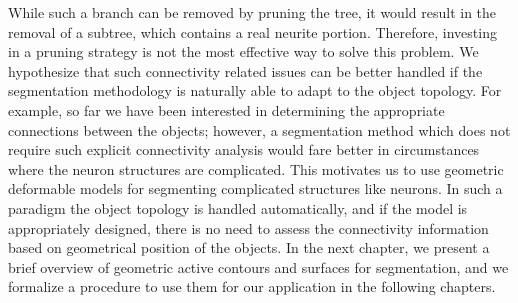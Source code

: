 While such a branch can be removed by pruning the tree, it would result in the removal of a subtree, which  contains a real neurite portion. Therefore, investing in  a pruning strategy is not the most effective way to solve this problem. We hypothesize that such connectivity related issues can be better handled if the segmentation methodology is naturally able to adapt to the object topology. For example, so far we have been interested in determining the appropriate connections between the objects; however, a segmentation method which does not require such explicit connectivity analysis would fare better in circumstances where the neuron structures are complicated. This motivates us to use geometric deformable models \cite{osher_sethian,caselles_geodesic} for segmenting complicated structures like neurons. In such a paradigm the object topology is handled automatically, and if the model is appropriately designed, there is no need to assess the connectivity information based on geometrical position of the objects. In the next chapter, we present a  brief overview of geometric active contours and surfaces for segmentation, and we formalize a procedure to use them for our application in the following chapters.
























